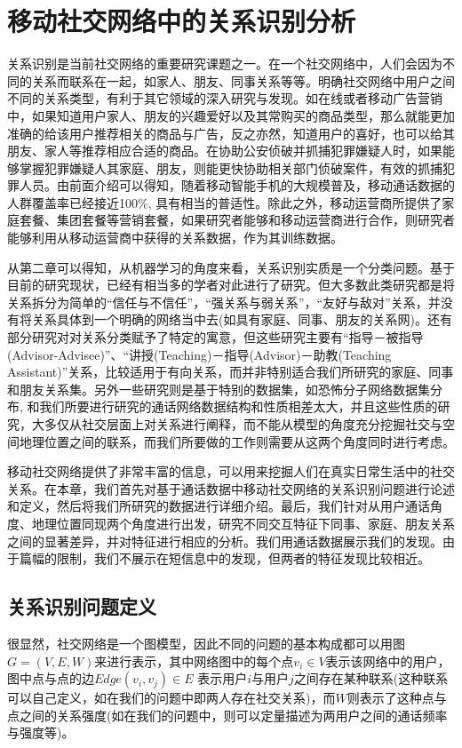 \chapter{移动社交网络中的关系识别分析}

\qquad 关系识别是当前社交网络的重要研究课题之一。在一个社交网络中，人们会因为不同的关系而联系在一起，如家人、朋友、同事关系等等。明确社交网络中用户之间不同的关系类型，有利于其它领域的深入研究与发现。如在线或者移动广告营销中，如果知道用户家人、朋友的兴趣爱好以及其常购买的商品类型，那么就能更加准确的给该用户推荐相关的商品与广告，反之亦然，知道用户的喜好，也可以给其朋友、家人等推荐相应合适的商品。在协助公安侦破并抓捕犯罪嫌疑人时，如果能够掌握犯罪嫌疑人其家庭、朋友，则能更快协助相关部门侦破案件，有效的抓捕犯罪人员。由前面介绍可以得知，随着移动智能手机的大规模普及，移动通话数据的人群覆盖率已经接近100\%, 具有相当的普适性。除此之外，移动运营商所提供了家庭套餐、集团套餐等营销套餐，如果研究者能够和移动运营商进行合作，则研究者能够利用从移动运营商中获得的关系数据，作为其训练数据。

从第二章可以得知，从机器学习的角度来看，关系识别实质是一个分类问题。基于目前的研究现状，已经有相当多的学者对此进行了研究。但大多数此类研究都是将关系拆分为简单的“信任与不信任”，“强关系与弱关系”，“友好与敌对”关系，并没有将关系具体到一个明确的网络当中去(如具有家庭、同事、朋友的关系网)。还有部分研究对对关系分类赋予了特定的寓意，但这些研究主要有“指导－被指导(Advisor-Advisee)”、“讲授(Teaching)－指导(Advisor)－助教(Teaching Assistant)”关系，比较适用于有向关系，而并非特别适合我们所研究的家庭、同事和朋友关系集。另外一些研究则是基于特别的数据集，如恐怖分子网络数据集分布, 和我们所要进行研究的通话网络数据结构和性质相差太大，并且这些性质的研究，大多仅从社交层面上对关系进行阐释，而不能从模型的角度充分挖掘社交与空间地理位置之间的联系，而我们所要做的工作则需要从这两个角度同时进行考虑。


移动社交网络提供了非常丰富的信息，可以用来挖掘人们在真实日常生活中的社交关系。在本章，我们首先对基于通话数据中移动社交网络的关系识别问题进行论述和定义，然后将我们所研究的数据进行详细介绍。最后，我们针对从用户通话角度、地理位置同现两个角度进行出发，研究不同交互特征下同事、家庭、朋友关系之间的显著差异，并对特征进行相应的分析。我们用通话数据展示我们的发现。由于篇幅的限制，我们不展示在短信息中的发现，但两者的特征发现比较相近。

\section{关系识别问题定义}
很显然，社交网络是一个图模型，因此不同的问题的基本构成都可以用图$G = (V, E, W)$来进行表示，其中网络图中的每个点$ v_i \in V$表示该网络中的用户，图中点与点的边$Edge(v_i, v_j) \in E$ 表示用户$i$与用户$j$之间存在某种联系(这种联系可以自己定义，如在我们的问题中即两人存在社交关系)，而$W$则表示了这种点与点之间的关系强度(如在我们的问题中，则可以定量描述为两用户之间的通话频率与强度等)。

